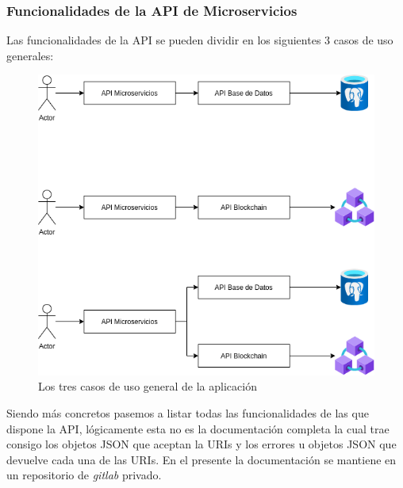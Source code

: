 \subsubsection{Funcionalidades de la API de Microservicios}
Las funcionalidades de la API se pueden dividir en los siguientes 3 casos de uso generales:

\begin{figure}[h!]
  \centering
  \includegraphics[width=0.6\linewidth]{figs/Desarrollo/UML}
  \caption[Arquitectura]{Los tres casos de uso general de la aplicación}
  \label{fig:casosUso}
\end{figure}

Siendo más concretos pasemos a listar todas las funcionalidades de las que dispone la API, lógicamente esta no es la documentación completa la cual trae consigo los objetos JSON que aceptan la URIs y los errores u objetos JSON que devuelve cada una de las URIs. En el presente la documentación se mantiene en un repositorio de \emph{gitlab} privado. \\

